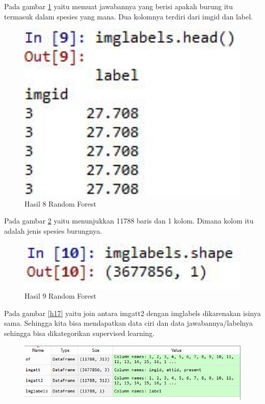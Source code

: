 \begin{enumerate}
\begin{figure}[!htbp]
\end{figure}
\subitem Pada gambar \ref{h15} yaitu memuat jawabannya yang berisi apakah burung itu termasuk dalam spesies yang mana. Dua kolomnya terdiri dari imgid dan label.
\begin{figure}[!htbp]
	\centerline{\includegraphics[width=1\textwidth]{figures/huda/chapter3_praktek/11.JPG}}
	\caption{Hasil 8 Random Forest}
	\label{h15}
\end{figure}
\subitem Pada gambar \ref{h16} yaitu menunjukkan 11788 baris dan 1 kolom. Dimana kolom itu adalah jenis spesies burungnya.
\begin{figure}[!htbp]
	\centerline{\includegraphics[width=1\textwidth]{figures/huda/chapter3_praktek/12.JPG}}
	\caption{Hasil 9 Random Forest}
	\label{h16}
\end{figure}
\subitem Pada gambar \ref{h17} yaitu join antara imgatt2 dengan imglabels dikarenakan isinya sama. Sehingga kita bisa mendapatkan data ciri dan data jawabannya/labelnya sehingga bisa dikategorikan supervised learning.
\begin{figure}[!htbp]
	\centerline{\includegraphics[width=1\textwidth]{figures/huda/chapter3_praktek/13.JPG}}

\end{figure}
\end{enumerate}

